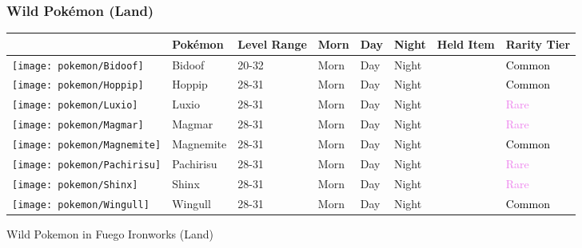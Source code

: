 \subsubsection{Wild Pokémon (Land)}%
\label{ssubsec:WildPokmon(Land)}%
\begin{longtable}{||l l l l l l l l||}%
\hline%
&Pokémon&Level Range&Morn&Day&Night&Held Item&Rarity Tier\\%
\hline%
\endhead%
\hline%
\texttt{[image: pokemon/Bidoof]}&Bidoof&20{-}32&Morn&Day&Night&&\textcolor{black}{%
Common%
}\\%
\hline%
\texttt{[image: pokemon/Hoppip]}&Hoppip&28{-}31&Morn&Day&Night&&\textcolor{black}{%
Common%
}\\%
\hline%
\texttt{[image: pokemon/Luxio]}&Luxio&28{-}31&Morn&Day&Night&&\textcolor{violet}{%
Rare%
}\\%
\hline%
\texttt{[image: pokemon/Magmar]}&Magmar&28{-}31&Morn&Day&Night&&\textcolor{violet}{%
Rare%
}\\%
\hline%
\texttt{[image: pokemon/Magnemite]}&Magnemite&28{-}31&Morn&Day&Night&&\textcolor{black}{%
Common%
}\\%
\hline%
\texttt{[image: pokemon/Pachirisu]}&Pachirisu&28{-}31&Morn&Day&Night&&\textcolor{violet}{%
Rare%
}\\%
\hline%
\texttt{[image: pokemon/Shinx]}&Shinx&28{-}31&Morn&Day&Night&&\textcolor{violet}{%
Rare%
}\\%
\hline%
\texttt{[image: pokemon/Wingull]}&Wingull&28{-}31&Morn&Day&Night&&\textcolor{black}{%
Common%
}\\%
\hline%
\end{longtable}%
\caption{Wild Pokemon in Fuego Ironworks (Land)}